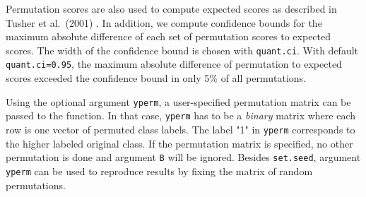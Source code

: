 \documentclass[11pt,a4paper,fleqn]{report}
\newcommand{\Rfunction}[1]{{\texttt{#1}}}
\newcommand{\Rfunarg}[1]{{\texttt{#1}}}
\begin{document}
Permutation scores are also used to compute expected scores as described in Tusher et al.~(2001) \cite{tusher01}. In addition, we compute confidence bounds for the maximum absolute difference of each set of permutation scores to expected scores. The width of the confidence bound is chosen with \Rfunarg{quant.ci}. With default \Rfunarg{quant.ci=0.95}, the maximum absolute difference of permutation to expected scores exceeded the confidence bound in only 5\% of all permutations.

Using the optional argument \Rfunarg{yperm}, a user-specified permutation matrix can be passed to the function. In that case, \Rfunarg{yperm} has to be a \textit{binary} matrix where each row is one vector of permuted class labels. The label "1" in \Rfunarg{yperm} corresponds to the higher labeled original class. If the permutation matrix is specified, no other permutation is done and argument \Rfunarg{B} will be ignored. Besides \Rfunction{set.seed}, argument \Rfunarg{yperm} can be used to reproduce results by fixing the matrix of random permutations.
\end{document}
